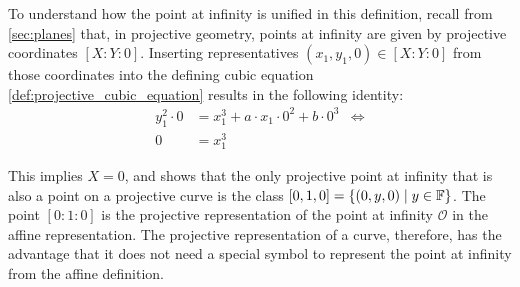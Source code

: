 To understand how the point at infinity is unified in this definition, recall from \secname{} \ref{sec:planes} that, in projective geometry, points at infinity are given by projective coordinates $[X:Y:0]$. Inserting representatives $(x_1,y_1,0)\in [X:Y:0]$ from those coordinates into the defining cubic equation \ref{def:projective_cubic_equation} results in the following identity:
\begin{align*}
y_1^2\cdot 0 & = x_1^3+a\cdot x_1\cdot 0^2 + b\cdot 0^3 & \Leftrightarrow \\
0 & = x_1^3
\end{align*} 

This implies $X=0$, and shows that the only projective point at infinity that is also a point on a projective  curve is the class $[0,1,0] = \{(0,y,0)\;|\; y\in \mathbb{F}\}$. The point $[0:1:0]$ is the projective representation of the point at infinity $\mathcal{O}$ in the affine representation. The projective representation of a  curve, therefore, has the advantage that it does not need a special symbol to represent the point at infinity from the affine definition.

